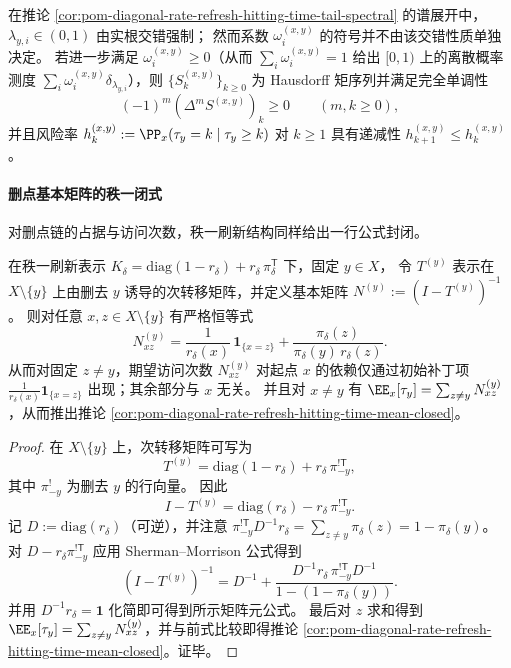 \begin{remark}[系数正性与完全单调尾]\label{rem:pom-diagonal-rate-refresh-hitting-time-tail-hausdorff-condition}
在推论 \ref{cor:pom-diagonal-rate-refresh-hitting-time-tail-spectral} 的谱展开中，\(\lambda_{y,i}\in(0,1)\) 由实根交错强制；
然而系数 \(\omega_i^{(x,y)}\) 的符号并不由该交错性质单独决定。
若进一步满足 \(\omega_i^{(x,y)}\ge 0\)（从而 \(\sum_i\omega_i^{(x,y)}=1\) 给出 \([0,1)\) 上的离散概率测度 \(\sum_i\omega_i^{(x,y)}\delta_{\lambda_{y,i}}\)），则 \(\{S_k^{(x,y)}\}_{k\ge 0}\) 为 Hausdorff 矩序列并满足完全单调性
\[
(-1)^m(\Delta^m S^{(x,y)})_k\ge 0\qquad(m,k\ge 0),
\]
并且风险率 \(h_k^{(x,y)}:=\PP_x(\tau_y=k\mid \tau_y\ge k)\) 对 \(k\ge 1\) 具有递减性 \(h_{k+1}^{(x,y)}\le h_k^{(x,y)}\)。
\end{remark}



\paragraph{删点基本矩阵的秩一闭式}
对删点链的占据与访问次数，秩一刷新结构同样给出一行公式封闭。

\begin{theorem}[删点基本矩阵秩一闭式]\label{thm:pom-diagonal-rate-refresh-fundamental-matrix-rankone}
在秩一刷新表示 \(K_\delta=\mathrm{diag}(1-r_\delta)+r_\delta\,\pi_\delta^{\mathsf T}\) 下，固定 \(y\in X\)，
令 \(T^{(y)}\) 表示在 \(X\setminus\{y\}\) 上由删去 \(y\) 诱导的次转移矩阵，并定义基本矩阵 \(N^{(y)}:=(I-T^{(y)})^{-1}\)。
则对任意 \(x,z\in X\setminus\{y\}\) 有严格恒等式
\[
N^{(y)}_{xz}=\frac{1}{r_\delta(x)}\,\mathbf 1_{\{x=z\}}+\frac{\pi_\delta(z)}{\pi_\delta(y)\,r_\delta(z)}.
\]
从而对固定 \(z\ne y\)，期望访问次数 \(N^{(y)}_{xz}\) 对起点 \(x\) 的依赖仅通过初始补丁项 \(\frac{1}{r_\delta(x)}\mathbf 1_{\{x=z\}}\) 出现；其余部分与 \(x\) 无关。
并且对 \(x\ne y\) 有
\(
\EE_x[\tau_y]=\sum_{z\ne y}N^{(y)}_{xz}
\)，从而推出推论 \ref{cor:pom-diagonal-rate-refresh-hitting-time-mean-closed}。
\end{theorem}
\begin{proof}
在 \(X\setminus\{y\}\) 上，次转移矩阵可写为
\[
T^{(y)}=\mathrm{diag}(1-r_\delta)+r_\delta\,\pi_{-y}^{!\mathsf T},
\]
其中 \(\pi_{-y}^{!}\) 为删去 \(y\) 的行向量。
因此
\[
I-T^{(y)}=\mathrm{diag}(r_\delta)-r_\delta\,\pi_{-y}^{!\mathsf T}.
\]
记 \(D:=\mathrm{diag}(r_\delta)\)（可逆），并注意 \(\pi_{-y}^{!\mathsf T}D^{-1}r_\delta=\sum_{z\ne y}\pi_\delta(z)=1-\pi_\delta(y)\)。
对 \(D-r_\delta\pi_{-y}^{!\mathsf T}\) 应用 Sherman--Morrison 公式得到
\[
(I-T^{(y)})^{-1}
=D^{-1}+\frac{D^{-1}r_\delta\,\pi_{-y}^{!\mathsf T}D^{-1}}{1-(1-\pi_\delta(y))}.
\]
并用 \(D^{-1}r_\delta=\mathbf 1\) 化简即可得到所示矩阵元公式。
最后对 \(z\) 求和得到 \(\EE_x[\tau_y]=\sum_{z\ne y}N^{(y)}_{xz}\)，并与前式比较即得推论 \ref{cor:pom-diagonal-rate-refresh-hitting-time-mean-closed}。证毕。
\end{proof}

